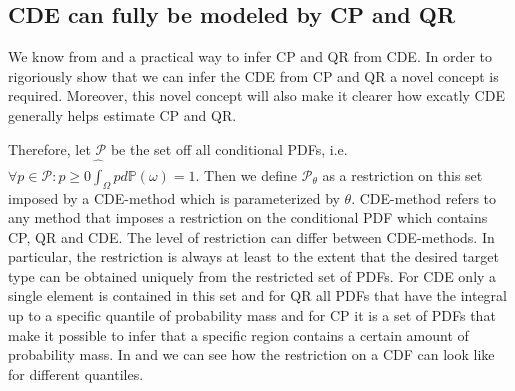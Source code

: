 \subsection{CDE can fully be modeled by CP and QR} \label{sec:cde_sub_cp_qr}

We know from  and  a practical way to infer CP and QR from CDE. In order to rigoriously show that we can infer the CDE from CP and QR a novel concept is required. Moreover, this novel concept will also make it clearer how excatly CDE generally helps estimate CP and QR.

Therefore, let $\mathcal{P}$ be the set off all conditional PDFs, i.e. $\forall p\in\mathcal{P}: p \geq 0 \hat \int_{\Omega} p d \mathbb{P}(\omega) = 1$. Then we define $\mathcal{P}_{\theta}$ as a restriction on this set imposed by a CDE-method which is parameterized by $\theta$. CDE-method refers to any method that imposes a restriction on the conditional PDF which contains CP, QR and CDE. The level of restriction can differ between CDE-methods. In particular, the restriction is always at least to the extent that the desired target type can be obtained uniquely from the restricted set of PDFs. For CDE only a single element is contained in this set and for QR all PDFs that have the integral up to a specific quantile of probability mass and for CP it is a set of PDFs that make it possible to infer that a specific region contains a certain amount of probability mass. In  and  we can see how the restriction on a CDF can look like for different quantiles. %

